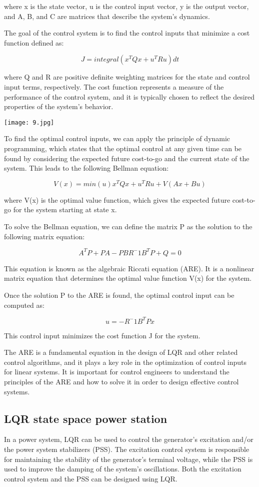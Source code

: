 \documentclass[12pt]{article}
\begin{document}
where x is the state vector, u is the control input vector, y is the output vector, and A, B, and C are matrices that describe the system's dynamics.

The goal of the control system is to find the control inputs that minimize a cost function defined as:

$$J = integral(x^TQx + u^TRu) dt$$

where Q and R are positive definite weighting matrices for the state and control input terms, respectively. The cost function represents a measure of the performance of the control system, and it is typically chosen to reflect the desired properties of the system's behavior.



\texttt{[image: 9.jpg]}



To find the optimal control inputs, we can apply the principle of dynamic programming, which states that the optimal control at any given time can be found by considering the expected future cost-to-go and the current state of the system. This leads to the following Bellman equation:

$$V(x) = min(u) {x^TQx + u^TRu + V(Ax + Bu)}$$

where V(x) is the optimal value function, which gives the expected future cost-to-go for the system starting at state x.

To solve the Bellman equation, we can define the matrix P as the solution to the following matrix equation:

$$A^TP + PA - PBR^-1B^TP + Q = 0$$

This equation is known as the algebraic Riccati equation (ARE). It is a nonlinear matrix equation that determines the optimal value function V(x) for the system.

Once the solution P to the ARE is found, the optimal control input can be computed as:

$$u = -R^-1B^TPx$$

This control input minimizes the cost function J for the system.

The ARE is a fundamental equation in the design of LQR and other related control algorithms, and it plays a key role in the optimization of control inputs for linear systems. It is important for control engineers to understand the principles of the ARE and how to solve it in order to design effective control systems.
\subsection{LQR state space power station}
In a power system, LQR can be used to control the generator's excitation and/or the power system stabilizers (PSS). The excitation control system is responsible for maintaining the stability of the generator's terminal voltage, while the PSS is used to improve the damping of the system's oscillations. Both the excitation control system and the PSS can be designed using LQR.
\end{document}
